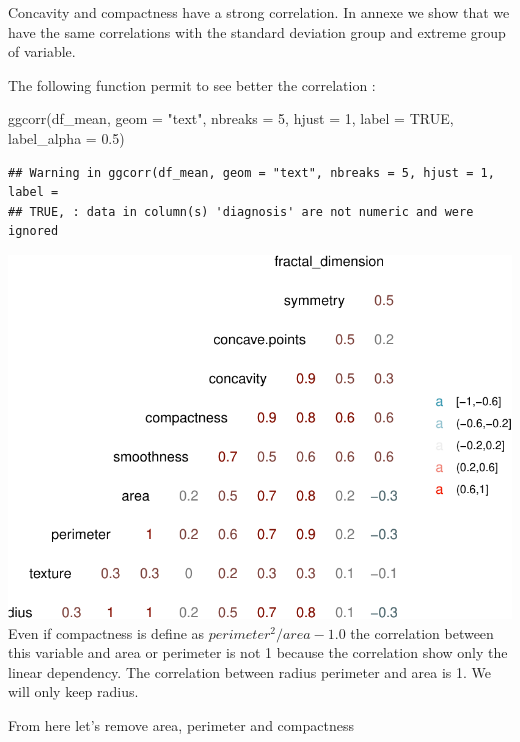 \documentclass[
  11pt,
]{article}
\newenvironment{Shaded}{\begin{snugshade}}{\end{snugshade}}
\newcommand{\AttributeTok}[1]{\textcolor[rgb]{0.77,0.63,0.00}{#1}}
\newcommand{\ConstantTok}[1]{\textcolor[rgb]{0.00,0.00,0.00}{#1}}
\newcommand{\DecValTok}[1]{\textcolor[rgb]{0.00,0.00,0.81}{#1}}
\newcommand{\FloatTok}[1]{\textcolor[rgb]{0.00,0.00,0.81}{#1}}
\newcommand{\FunctionTok}[1]{\textcolor[rgb]{0.00,0.00,0.00}{#1}}
\newcommand{\NormalTok}[1]{#1}
\newcommand{\StringTok}[1]{\textcolor[rgb]{0.31,0.60,0.02}{#1}}
\begin{document}
Concavity and compactness have a strong correlation. In annexe we show
that we have the same correlations with the standard deviation group and
extreme group of variable.

The following function permit to see better the correlation :

\begin{Shaded}
\begin{Highlighting}[]
\FunctionTok{ggcorr}\NormalTok{(df\_mean, }\AttributeTok{geom =} \StringTok{"text"}\NormalTok{, }\AttributeTok{nbreaks =} \DecValTok{5}\NormalTok{, }\AttributeTok{hjust =} \DecValTok{1}\NormalTok{, }\AttributeTok{label =} \ConstantTok{TRUE}\NormalTok{, }\AttributeTok{label\_alpha =} \FloatTok{0.5}\NormalTok{)}
\end{Highlighting}
\end{Shaded}

\begin{verbatim}
## Warning in ggcorr(df_mean, geom = "text", nbreaks = 5, hjust = 1, label =
## TRUE, : data in column(s) 'diagnosis' are not numeric and were ignored
\end{verbatim}

\includegraphics{stat_DAP_files/figure-latex/unnamed-chunk-7-1.pdf} Even
if compactness is define as \(perimeter^2 / area - 1.0\) the correlation
between this variable and area or perimeter is not 1 because the
correlation show only the linear dependency. The correlation between
radius perimeter and area is 1. We will only keep radius.

From here let's remove area, perimeter and compactness
\end{document}
